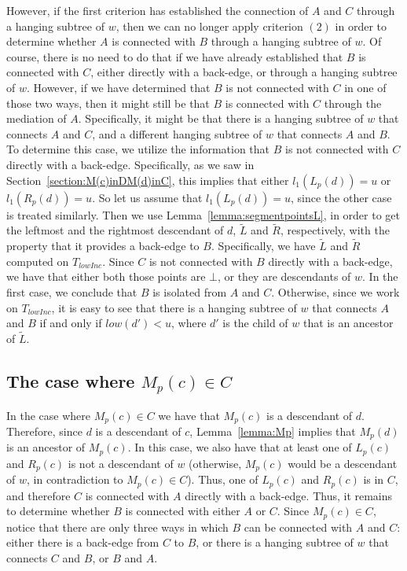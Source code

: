 \documentclass[11pt,a4paper]{article}
\begin{document}
However, if the first criterion has established the connection of $A$ and $C$ through a hanging subtree of $w$, then we can no longer apply criterion $(2)$ in order to determine whether $A$ is connected with $B$ through a hanging subtree of $w$. Of course, there is no need to do that if we have already established that $B$ is connected with $C$, either directly with a back-edge, or through a hanging subtree of $w$. However, if we have determined that $B$ is not connected with $C$ in one of those two ways, then it might still be that $B$ is connected with $C$ through the mediation of $A$. Specifically, it might be that there is a hanging subtree of $w$ that connects $A$ and $C$, and a different hanging subtree of $w$ that connects $A$ and $B$. To determine this case, we utilize the information that $B$ is not connected with $C$ directly with a back-edge. Specifically, as we saw in Section~\ref{section:M(c)inDM(d)inC}, this implies that either $l_1(L_p(d))=u$ or $l_1(R_p(d))=u$. So let us assume that $l_1(L_p(d))=u$, since the other case is treated similarly. Then we use Lemma~\ref{lemma:segmentpointsL}, in order to get the leftmost and the rightmost descendant of $d$, $\widetilde{L}$ and $\widetilde{R}$, respectively, with the property that it provides a back-edge to $B$. Specifically, we have $\widetilde{L}$ and $\widetilde{R}$ computed on $T_\mathit{lowInc}$. Since $C$ is not connected with $B$ directly with a back-edge, we have that either both those points are $\bot$, or they are descendants of $w$. In the first case, we conclude that $B$ is isolated from $A$ and $C$. Otherwise, since we work on $T_\mathit{lowInc}$, it is easy to see that there is a hanging subtree of $w$ that connects $A$ and $B$ if and only if $\mathit{low}(d')<u$, where $d'$ is the child of $w$ that is an ancestor of $\widetilde{L}$.

\subsection{The case where $M_p(c)\in C$}
\label{section:MpCinC}
In the case where $M_p(c)\in C$ we have that $M_p(c)$ is a descendant of $d$. Therefore, since $d$ is a descendant of $c$, Lemma~\ref{lemma:Mp} implies that $M_p(d)$ is an ancestor of $M_p(c)$. In this case, we also have that at least one of $L_p(c)$ and $R_p(c)$ is not a descendant of $w$ (otherwise, $M_p(c)$ would be a descendant of $w$, in contradiction to $M_p(c)\in C$). Thus, one of $L_p(c)$ and $R_p(c)$ is in $C$, and therefore $C$ is connected with $A$ directly with a back-edge. Thus, it remains to determine whether $B$ is connected with either $A$ or $C$. Since $M_p(c)\in C$, notice that there are only three ways in which $B$ can be connected with $A$ and $C$: either there is a back-edge from $C$ to $B$, or there is a hanging subtree of $w$ that connects $C$ and $B$, or $B$ and $A$.  
\end{document}
